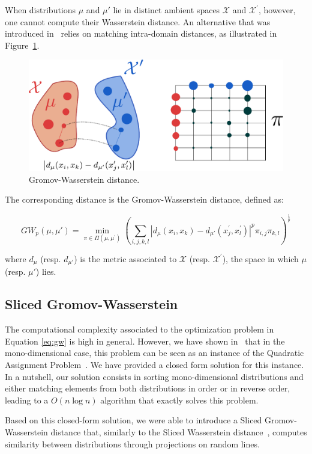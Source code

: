 When distributions $\mu$ and $\mu'$ lie in distinct ambient spaces $\mathcal{X}$
and $\mathcal{X}^\prime$,
however, one cannot compute their Wasserstein distance. An alternative that was
introduced in~\cite{memoli2011gromov} relies on matching intra-domain
distances, as illustrated in Figure~\ref{fig:gw}.

\begin{figure}
\centering
\includegraphics[width=.6\textwidth]{fig/gw}
\caption{Gromov-Wasserstein distance. \label{fig:gw}}
\end{figure}

The corresponding distance is the Gromov-Wasserstein distance, defined as:

\begin{equation}
    GW_p(\mu, \mu') = \min_{\pi \in \Pi(\mu, \mu^\prime)}
        \left(
            \sum_{i,j,k,l}
            \left| d_\mu(x_i, x_k) - d_{\mu'}(x^\prime_j, x^\prime_l) \right|^p
            \pi_{i,j} \pi_{k,l}
        \right)^{\frac{1}{p}}
    \label{eq:gw}
\end{equation}

\noindent
where $d_\mu$ (resp. $d_{\mu'}$) is the metric associated to $\mathcal{X}$
(resp. $\mathcal{X}^\prime$), the space in which $\mu$ (resp. $\mu'$) lies.

\subsection{Sliced Gromov-Wasserstein}

The computational complexity associated to the optimization problem in
Equation \eqref{eq:gw} is high in general.
However, we have shown in~\cite{vayer:hal-02174309} that in the
mono-dimensional case, this problem can be seen as an instance of the Quadratic
Assignment Problem~\cite{koopmans1957assignment}.
We have provided a closed form solution for this instance.
In a nutshell, our solution consists in sorting mono-dimensional distributions
and either matching elements from both distributions in order or in reverse
order, leading to a $O(n \log n)$ algorithm that exactly solves this problem.

Based on this closed-form solution, we were able to introduce a Sliced
Gromov-Wasserstein distance that, similarly to the Sliced Wasserstein
distance~\cite{rabin2011wasserstein}, computes similarity between distributions
through projections on random lines.

